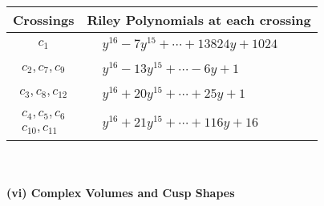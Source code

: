 \documentclass[1p]{elsarticle_modified}
\theoremstyle{definition}
\begin{document}
\begin{tabular}{m{50pt}|m{274pt}}
Crossings & \hspace{64pt}Riley Polynomials at each crossing \\
\hline $$\begin{aligned}c_{1}\end{aligned}$$&$\begin{aligned}
&y^{16}-7 y^{15}+\cdots+13824 y+1024
\end{aligned}$\\
\hline $$\begin{aligned}c_{2},c_{7},c_{9}\end{aligned}$$&$\begin{aligned}
&y^{16}-13 y^{15}+\cdots-6 y+1
\end{aligned}$\\
\hline $$\begin{aligned}c_{3},c_{8},c_{12}\end{aligned}$$&$\begin{aligned}
&y^{16}+20 y^{15}+\cdots+25 y+1
\end{aligned}$\\
\hline $$\begin{aligned}c_{4},c_{5},c_{6}\\c_{10},c_{11}\end{aligned}$$&$\begin{aligned}
&y^{16}+21 y^{15}+\cdots+116 y+16
\end{aligned}$\\
\hline
\end{tabular}\\~\\
\newpage\flushleft \textbf{(vi) Complex Volumes and Cusp Shapes}
\end{document}
